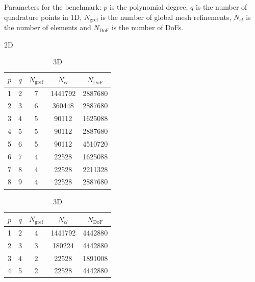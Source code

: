 \documentclass[AMA,STIX1COL]{WileyNJD-v2}
\begin{document}
%
\begin{table}[!htb]
  \caption{Parameters for the benchmark: $p$ is the polynomial degree,
  $q$ is the number of quadrature points in 1D, $N_{\text{gref}}$ is the number of global mesh refinements, $N_{el}$ is the number of elements and $N_{\text{DoF}}$ is the number of DoFs.}
  \begin{subtable}{.49\linewidth}
  \caption{2D}
  \label{tab:input_parameters_2d}
  \centering
  \begin{tabular}{ccccc}
  \hline
    $p$ & $q$ & $N_{\text{gref}}$ & $N_{el}$ & $N_{\text{DoF}}$ \\
  \hline
    1 & 2 & 7 & 1441792 & 2887680 \\
    2 & 3 & 6 & 360448 & 2887680 \\
    3 & 4 & 5 & 90112 & 1625088 \\
    4 & 5 & 5 & 90112 & 2887680 \\
    5 & 6 & 5 & 90112 & 4510720 \\
    6 & 7 & 4 & 22528 & 1625088 \\
    7 & 8 & 4 & 22528 & 2211328 \\
    8 & 9 & 4 & 22528 & 2887680 \\
  \hline
  \end{tabular}
  \end{subtable}
  \begin{subtable}{.49\linewidth}
  \caption{3D}
  \label{tab:input_parameters_3d}
  \centering
  \begin{tabular}{ccccc}
  \hline
    $p$ & $q$ & $N_{\text{gref}}$ & $N_{el}$ & $N_{\text{DoF}}$ \\
  \hline
    1 & 2 & 4 & 1441792 & 4442880 \\
    2 & 3 & 3 & 180224 & 4442880 \\
    3 & 4 & 2 & 22528 & 1891008 \\
    4 & 5 & 2 & 22528 & 4442880 \\
  \hline
  \end{tabular}
  \end{subtable}
\end{table}
\end{document}
